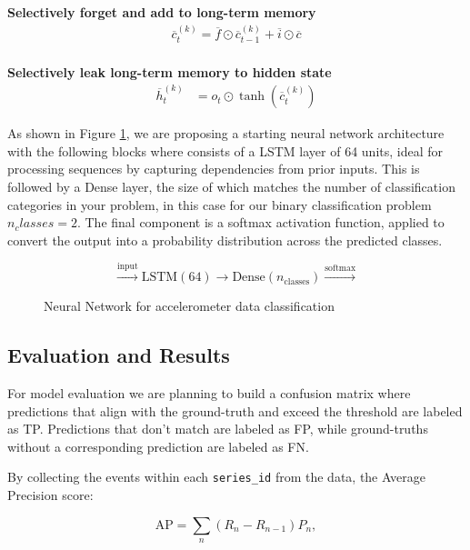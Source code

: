 \documentclass{article}
\begin{document}
\textbf{Selectively forget and add to long-term memory}
\begin{equation*}
\begin{aligned}
    \overline{c}^{(k)}_{t} = \overline{f} \odot \overline{c}^{(k)}_{t-1} + \overline{i} \odot \overline{c} \\
\end{aligned}
\end{equation*}

\textbf{Selectively leak long-term memory to hidden state}
\begin{equation*}
\begin{aligned}
    \overline{h}^{(k)}_{t} &= o_t \odot \tanh(\overline{c}^{(k)}_{t})
\end{aligned}
\end{equation*}

As shown  in Figure \ref{fig:neuralnetwork}, we are proposing a starting neural network architecture with the following blocks where consists of a LSTM layer of 64 units, ideal for processing sequences by capturing dependencies from prior inputs. This is followed by a Dense layer, the size of which matches the number of classification categories in your problem, in this case for our binary classification problem \(n_classes = 2\). The final component is a softmax activation function, applied to convert the output into a probability distribution across the predicted classes. 

\begin{figure}[h]
  \centering
  \[
  \xrightarrow{\text{input}} \boxed{\text{LSTM} (64)} \rightarrow \boxed{\text{Dense} (n_{\text{classes}})} \xrightarrow{\text{softmax}}
  \]
  \caption{Neural Network for accelerometer data classification}
  \label{fig:neuralnetwork}
\end{figure}

\subsection{Evaluation and Results}

For model evaluation we are planning to build a confusion matrix where predictions that align with the ground-truth and exceed the threshold are labeled as TP. Predictions that don't match are labeled as FP, while ground-truths without a corresponding prediction are labeled as FN.

By collecting the events within each \texttt{series\_id} from the data, the Average Precision score: 

\begin{equation*}
    \text{AP} = \sum_n (R_n - R_{n-1}) P_n,
\end{equation*}
\end{document}
